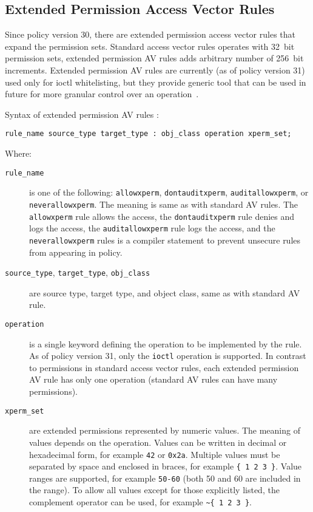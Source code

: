 \subsection{Extended Permission Access Vector Rules}
\label{extavrules}

Since policy version 30, there are extended permission access vector rules that
expand the permission sets. Standard access vector rules operates with 32~bit
permission sets, extended permission AV rules adds arbitrary number of 256~bit
increments. Extended permission AV rules are currently (as of policy version 31)
used only for ioctl whitelisting, but they provide generic tool that can be used
in future for more granular control over an operation~\cite{selinuxmailxperms}.

Syntax of extended permission AV rules \cite{xpermrules}:
\begin{lstlisting}[language=te]
rule_name source_type target_type : obj_class operation xperm_set;
\end{lstlisting}
Where:
\begin{description}
    \item [\texttt{rule\_name}] is one of the following: \texttt{allowxperm},
        \texttt{dontauditxperm}, \texttt{auditallowxperm}, or
        \texttt{neverallowxperm}. The meaning is same as with standard AV rules.
        The \texttt{allowxperm} rule allows the access, the
        \texttt{dontauditxperm} rule denies and logs the access, the
        \texttt{auditallowxperm} rule logs the access, and the
        \texttt{neverallowxperm} rules is a compiler statement to prevent
        unsecure rules from appearing in policy.
    \item [\texttt{source\_type}, \texttt{target\_type}, \texttt{obj\_class}]
        are source type, target type, and object class, same as with standard AV
        rule.
    \item [\texttt{operation}] is a single keyword defining the operation to be
        implemented by the rule. As of policy version 31, only the
        \texttt{ioctl} operation is supported. In contrast to permissions in
        standard access vector rules, each extended permission AV rule has only
        one operation (standard AV rules can have many permissions).
    \item [\texttt{xperm\_set}] are extended permissions represented by numeric
        values. The meaning of values depends on the operation. Values can be
        written in decimal or hexadecimal form, for example \texttt{42} or
        \texttt{0x2a}. Multiple values must be separated by space and enclosed
        in braces, for example \texttt{\{ 1 2 3 \}}. Value ranges are supported,
        for example \texttt{50-60} (both 50 and 60 are included in the range).
        To allow all values except for those explicitly listed, the complement
        operator can be used, for example \texttt{\textasciitilde \{ 1 2 3 \}}.
\end{description}

